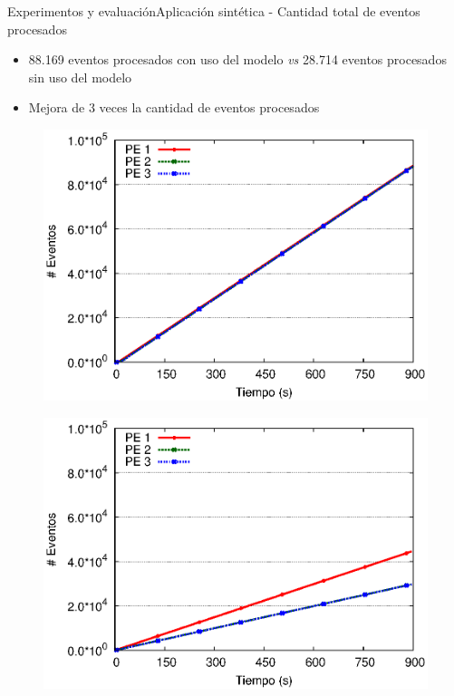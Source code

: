 \begin{frame}{Experimentos y evaluación}{Aplicación sintética - Cantidad total de eventos procesados}

\begin{itemize}
\item 88.169 eventos procesados con uso del modelo \textit{vs} 28.714 eventos procesados sin uso del modelo
\item Mejora de 3 veces la cantidad de eventos procesados
\end{itemize}

\begin{multicols}{2}
\begin{figure}[p]
	\centering
	\includegraphics[scale=0.475]{images/exp/app3/cm/logical/eventCount.eps}
\end{figure}

\begin{figure}[p]
	\centering
	\includegraphics[scale=0.475]{images/exp/app3/sm/logical/eventCount.eps}
\end{figure}
\end{multicols}
\end{frame}